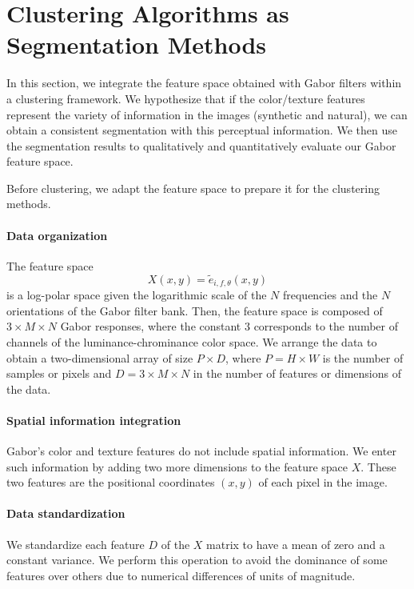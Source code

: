\documentclass[journal]{IEEEtran}
\begin{document}
\section{Clustering Algorithms as Segmentation Methods}

In this section, we integrate the feature space obtained with Gabor filters within a clustering framework. We hypothesize that if the color/texture features represent the variety of information in the images (synthetic and natural), we can obtain a consistent segmentation with this perceptual information. We then use the segmentation results to qualitatively and quantitatively evaluate our Gabor feature space.

Before clustering, we adapt the feature space to prepare it for the clustering methods.

\paragraph{Data organization}
The feature space 
\begin{equation}\label{eq:feature_space_clustering}
	X(x,y) = \widetilde{e}_{i, f, \theta}(x,y)
\end{equation}
is a log-polar space given the logarithmic scale of the $N$ frequencies and the $N$ orientations of the Gabor filter bank. Then, the feature space is composed of $3 \times M \times N$ Gabor responses, where the constant $3$ corresponds to the number of channels of the luminance-chrominance color space. We arrange the data to obtain a two-dimensional array of size $P \times D$, where $P= H\times W$  is the number of samples or pixels and $D =3 \times M \times N$ in the number of features or dimensions of the data.

\paragraph{Spatial information integration}
Gabor's color and texture features do not include spatial information. We enter such information by adding two more dimensions to the feature space $X$. These two features are the positional coordinates $(x, y)$ of each pixel in the image. 

\paragraph{Data standardization}
We standardize each feature $D$ of the $X$ matrix to have a mean of zero and a constant variance. We perform this operation to avoid the dominance of some features over others due to numerical differences of units of magnitude.
\end{document}
